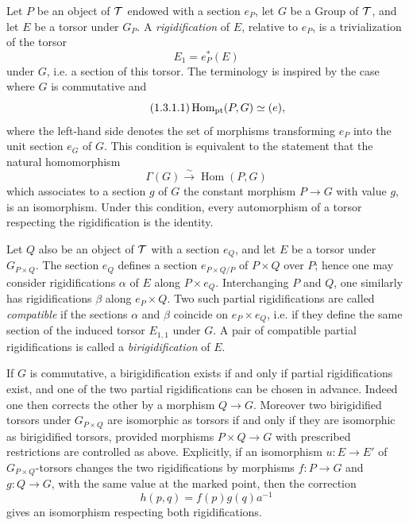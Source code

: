 \documentclass[11pt]{article}
\begin{document}
Let \(P\) be an object of \(\mathcal T\) endowed with a section \(e_P\), let \(G\) be a Group of \(\mathcal T\), and let \(E\) be a torsor under \(G_P\).  A \emph{rigidification} of \(E\), relative to \(e_P\), is a trivialization of the torsor
\[
  E_1=e_P^*(E)
\]
under \(G\), i.e. a section of this torsor.  The terminology is inspired by the case where \(G\) is commutative and
\begin{equation}\tag{1.3.1.1}
  \operatorname{Hom}_{\mathrm{pt}}(P,G)\simeq (e),
\end{equation}
where the left-hand side denotes the set of morphisms transforming \(e_P\) into the unit section \(e_G\) of \(G\).  This condition is equivalent to the statement that the natural homomorphism
\begin{equation}\tag{1.3.1.2}
  \Gamma(G)\xrightarrow{\sim}\operatorname{Hom}(P,G)
\end{equation}
which associates to a section \(g\) of \(G\) the constant morphism \(P\to G\) with value \(g\), is an isomorphism.  Under this condition, every automorphism of a torsor respecting the rigidification is the identity.

Let \(Q\) also be an object of \(\mathcal T\) with a section \(e_Q\), and let \(E\) be a torsor under \(G_{P\times Q}\).  The section \(e_Q\) defines a section \(e_{P\times Q/P}\) of \(P\times Q\) over \(P\); hence one may consider rigidifications \(\alpha\) of \(E\) along \(P\times e_Q\).  Interchanging \(P\) and \(Q\), one similarly has rigidifications \(\beta\) along \(e_P\times Q\).  Two such partial rigidifications are called \emph{compatible} if the sections \(\alpha\) and \(\beta\) coincide on \(e_P\times e_Q\), i.e. if they define the same section of the induced torsor \(E_{1,1}\) under \(G\).  A pair of compatible partial rigidifications is called a \emph{birigidification} of \(E\).

If \(G\) is commutative, a birigidification exists if and only if partial rigidifications exist, and one of the two partial rigidifications can be chosen in advance.  Indeed one then corrects the other by a morphism \(Q\to G\).  Moreover two birigidified torsors under \(G_{P\times Q}\) are isomorphic as torsors if and only if they are isomorphic as birigidified torsors, provided morphisms \(P\times Q\to G\) with prescribed restrictions are controlled as above.  Explicitly, if an isomorphism \(u:E\to E'\) of \(G_{P\times Q}\)-torsors changes the two rigidifications by morphisms \(f:P\to G\) and \(g:Q\to G\), with the same value at the marked point, then the correction
\[
  h(p,q)=f(p)g(q)a^{-1}
\]
gives an isomorphism respecting both rigidifications.
\end{document}
